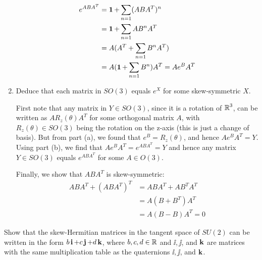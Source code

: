 \documentclass[12pt,onecolumn]{article}
\begin{document}
\begin{exercise}
\begin{enumerate}[label=(\alph*)]
\begin{answer}
\begin{align*}
        e^{ABA^T} &= \operatorname{\mathbf{1}} + \sum_{n=1} (ABA^T)^n \\
        &= \operatorname{\mathbf{1}} + \sum_{n=1} AB^nA^T \\
        &= A(A^T + \sum_{n=1} B^nA^T ) \\
        &= A(\operatorname{\mathbf{1}} + \sum_{n=1} B^n)A^T = Ae^BA^T
    \end{align*}
    \end{answer}
    \item Deduce that each matrix in $SO(3)$ equals $e^X$ for some skew-symmetric $X$.
    \begin{answer}
    First note that any matrix in $Y \in SO(3)$, since it is a rotation of $\operatorname{\mathbb{R}}^3$, can be written as $AR_z(\theta)A^T$ for some orthogonal matrix  $A$, with $R_z(\theta) \in SO(3)$ being the rotation on the z-axis (this is just a change of basis). But from part (a), we found that $e^B = R_z(\theta)$, and hence $Ae^BA^T = Y$. Using part (b), we find that $Ae^BA^T = e^{ABA^T} = Y$ and hence any matrix $Y \in SO(3)$ equals $e^{ABA^T}$ for some $A \in O(3)$. 
    
    Finally, we show that $ABA^T$ is skew-symmetric:
    \begin{align*}
        ABA^T + (ABA^T)^T &= ABA^T + AB^TA^T \\
        &= A(B+B^T)A^T \\
        &= A(B-B)A^T = 0
    \end{align*}
    \end{answer}
\end{enumerate}

\end{exercise}
\begin{exercise}
Show that the skew-Hermitian matrices in the tangent space of $SU(2)$ can be written in the form $b\operatorname{\textbf{i}}+c\operatorname{\textbf{j}}+d\operatorname{\textbf{k}}$, where $b,c,d \in \operatorname{\mathbb{R}}$ and $\ii, \jj$, and $\operatorname{\textbf{k}}$ are matrices with the same multiplication table as the quaternions $\ii, \jj$, and $\operatorname{\textbf{k}}$.
\end{exercise}
\end{document}
